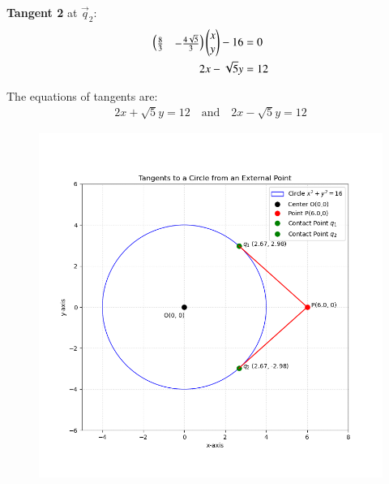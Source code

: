 \documentclass[article]{IEEEtran}
\begin{document}
	\textbf{Tangent 2} at $\vec{q}_2$:
	\begin{align}
		\begin{pmatrix}\frac{8}{3} & -\frac{4\sqrt{5}}{3}\end{pmatrix}\begin{pmatrix}x\\y\end{pmatrix} - 16 &= 0\\
		2x - \sqrt{5}y &= 12
	\end{align}
	
	The equations of tangents are:
	\begin{align}
		\boxed{2x + \sqrt{5}y = 12 \quad \text{and} \quad 2x - \sqrt{5}y = 12}
	\end{align}
	
	\begin{figure}[H]
		\centering
		\includegraphics[width=1.1\linewidth]{figs/tangents_plot}
	\end{figure}
	
	
\end{document}

